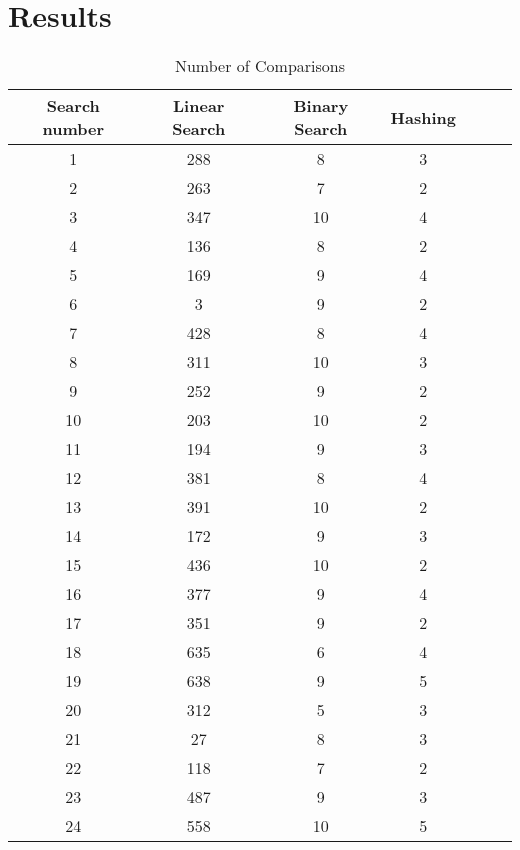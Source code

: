 \documentclass[letterpaper, 10pt,DIV=13]{scrartcl}
\numberwithin{equation}{section} %
\numberwithin{figure}{section} %
\numberwithin{table}{section} %
\begin{document}

\pagebreak


\section{Results}

\begin{table}[H]
\centering
\caption{Number of Comparisons}
\begin{tabular}{|c|c|c|c|c|c|c|}
\hline
Search number & Linear Search & Binary Search & Hashing \\
\hline
1 & 288 & 8 & 3 \\
\hline
2 & 263 & 7 & 2 \\
\hline
3 & 347 & 10 & 4 \\
\hline
4 & 136 & 8 & 2 \\
\hline
5 & 169 & 9 & 4 \\
\hline
6 & 3 & 9 & 2 \\
\hline
7 & 428 & 8 & 4 \\
\hline
8 & 311 & 10 & 3 \\
\hline
9 & 252 & 9 & 2 \\
\hline
10 & 203 & 10 & 2 \\
\hline
11 & 194 & 9 & 3 \\
\hline
12 & 381 & 8 & 4 \\
\hline
13 & 391 & 10 & 2 \\
\hline
14 & 172 & 9 & 3 \\
\hline
15 & 436 & 10 & 2 \\
\hline
16 & 377 & 9 & 4 \\
\hline
17 & 351 & 9 & 2 \\
\hline
18 & 635 & 6 & 4 \\
\hline
19 & 638 & 9 & 5 \\
\hline
20 & 312 & 5 & 3 \\
\hline
21 & 27 & 8 & 3 \\
\hline
22 & 118 & 7 & 2 \\
\hline
23 & 487 & 9 & 3 \\
\hline
24 & 558 & 10 & 5 \\

\end{tabular}
\end{table}
\end{document}

